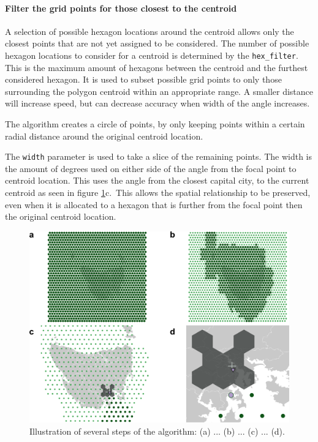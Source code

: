 \hypertarget{filter-the-grid-points-for-those-closest-to-the-centroid}{%
\paragraph{Filter the grid points for those closest to the
centroid}\label{filter-the-grid-points-for-those-closest-to-the-centroid}}

A selection of possible hexagon locations around the centroid allows
only the closest points that are not yet assigned to be considered. The
number of possible hexagon locations to consider for a centroid is
determined by the \texttt{hex\_filter}. This is the maximum amount of
hexagons between the centroid and the furthest considered hexagon. It is
used to subset possible grid points to only those surrounding the
polygon centroid within an appropriate range. A smaller distance will
increase speed, but can decrease accuracy when width of the angle
increases.

The algorithm creates a circle of points, by only keeping points within
a certain radial distance around the original centroid location.

The \texttt{width} parameter is used to take a slice of the remaining
points. The width is the amount of degrees used on either side of the
angle from the focal point to centroid location. This uses the angle
from the closest capital city, to the current centroid as seen in figure
\ref{fig:filterprocess}c.~This allows the spatial relationship to be
preserved, even when it is allocated to a hexagon that is further from
the focal point then the original centroid location.

\begin{Schunk}
\begin{figure}
\includegraphics[width=0.95\linewidth]{kobakian-cook_files/figure-latex/filterprocess-1} \caption[Illustration of several steps of the algorithm]{Illustration of several steps of the algorithm: (a) ... (b) ... (c) ... (d). }\label{fig:filterprocess}
\end{figure}
\end{Schunk}

